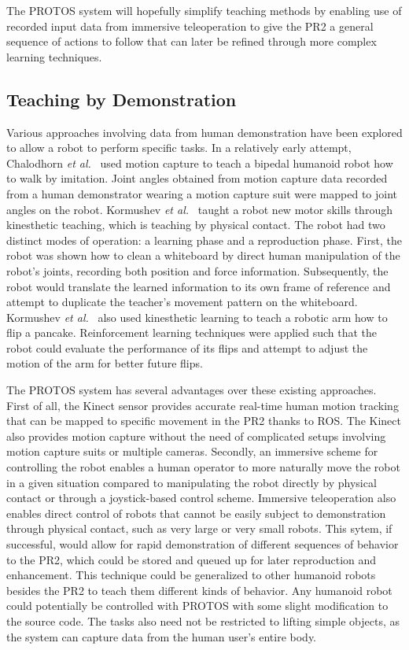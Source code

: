 \documentclass{sig-alternate}
\begin{document}
\indent The PROTOS system will hopefully simplify teaching methods by enabling use of recorded input data from immersive teleoperation to give the PR2 
a general sequence of actions  to follow that can later be refined through more complex learning techniques.

\subsection{Teaching by Demonstration}
\label{sec:demo_teach}
\indent Various approaches involving data from human demonstration have been explored to allow a robot to perform specific tasks. In a relatively early attempt, 
Chalodhorn \textit{et al.}~\cite{walk_imitation} used motion capture to teach a bipedal humanoid robot how to walk by imitation. Joint angles obtained from motion capture 
data recorded from a human demonstrator wearing a motion capture suit were mapped to joint angles on the robot.
Kormushev \textit{et al.}~\cite{whiteboard} taught a robot new motor skills through kinesthetic teaching, which is 
teaching by physical contact. The robot had two distinct modes of operation: a learning phase and a reproduction phase. First, the robot was shown how to clean a whiteboard 
by direct human manipulation of the robot's joints, recording both position and force information. Subsequently, the robot would translate the learned information to its own 
frame of reference and attempt to duplicate the teacher's movement pattern on the whiteboard.  Kormushev \textit{et al.}~\cite{pancakes} also used kinesthetic learning to 
teach a robotic arm how to flip a pancake. 
Reinforcement learning techniques were applied such that the robot could evaluate the performance of its flips and attempt to adjust the motion 
of the arm for better future flips.

\indent The PROTOS system has several advantages over these existing approaches. First of all, the Kinect sensor provides accurate real-time human
motion tracking that can be mapped to specific movement in the PR2 thanks to ROS. The Kinect also provides motion capture without the need
of complicated setups involving motion capture suits or multiple cameras. Secondly, an immersive scheme for controlling the robot
enables a human operator to more naturally move the robot in a given situation compared to manipulating the robot directly by physical
contact or through a joystick-based control scheme. Immersive teleoperation also enables direct control of robots that cannot be easily
subject to demonstration through physical contact, such as very large or very small robots. This sytem, if successful, would allow for rapid demonstration of different 
sequences of behavior to the PR2, which could be stored and queued up for later reproduction and enhancement. This technique could be generalized to other humanoid robots 
besides the PR2 to teach them different kinds of behavior. Any humanoid robot could potentially be controlled with PROTOS with some slight modification to the source code.
The tasks also need not be restricted to lifting simple objects, as the system can capture data from the human user's entire body.
\end{document}
